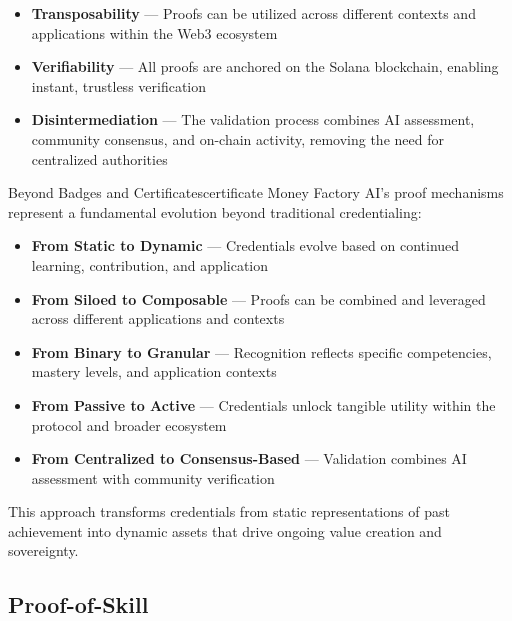 \begin{itemize}
    \item \textbf{Transposability} — Proofs can be utilized across different contexts and applications within the Web3 ecosystem
    
    \item \textbf{Verifiability} — All proofs are anchored on the Solana blockchain, enabling instant, trustless verification
    
    \item \textbf{Disintermediation} — The validation process combines AI assessment, community consensus, and on-chain activity, removing the need for centralized authorities
\end{itemize}

\begin{mfai-box}{Beyond Badges and Certificates}{certificate}
Money Factory AI's proof mechanisms represent a fundamental evolution beyond traditional credentialing:

\begin{itemize}
    \item \textbf{From Static to Dynamic} — Credentials evolve based on continued learning, contribution, and application
    
    \item \textbf{From Siloed to Composable} — Proofs can be combined and leveraged across different applications and contexts
    
    \item \textbf{From Binary to Granular} — Recognition reflects specific competencies, mastery levels, and application contexts
    
    \item \textbf{From Passive to Active} — Credentials unlock tangible utility within the protocol and broader ecosystem
    
    \item \textbf{From Centralized to Consensus-Based} — Validation combines AI assessment with community verification
\end{itemize}

This approach transforms credentials from static representations of past achievement into dynamic assets that drive ongoing value creation and sovereignty.
\end{mfai-box}

\subsection{Proof-of-Skill\texttrademark}

